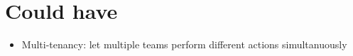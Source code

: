\documentclass[a4paper,article,oneside]{memoir}
\begin{document}
\section{Could have}

\begin{itemize}
    \item Multi-tenancy: let multiple teams perform different actions simultanuously
\end{itemize}



\end{document}
